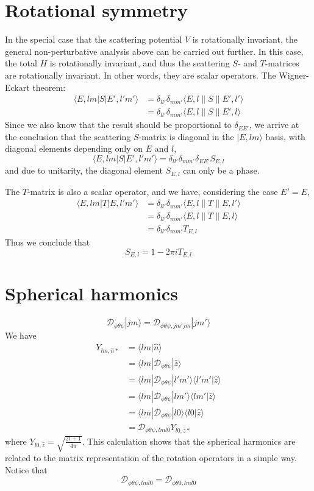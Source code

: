 \documentclass[12pt, oneside]{book}
\begin{document}
\section*{Rotational symmetry}
In the special case that the scattering potential $V$ is rotationally invariant, the general non-perturbative analysis above can be carried out further. In this case, the total $H$ is rotationally invariant, and thus the scattering $S$- and $T$-matrices are rotationally invariant. In other words, they are scalar operators. The Wigner-Eckart theorem:
\begin{align*}
\langle E,lm|S|E',l'm'\rangle
&=\delta_{ll'}\delta_{mm'}\langle E,l\|S\|E',l'\rangle\\
&=\delta_{ll'}\delta_{mm'}\langle E,l\|S\|E',l\rangle
\end{align*}
Since we also know that the result should be proportional to $\delta_{EE'}$, we arrive at the conclusion that the scattering $S$-matrix is diagonal in the $|E,lm\rangle$ basis, with diagonal elements depending only on $E$ and $l$,
\[
\langle E,lm|S|E',l'm'\rangle=\delta_{ll'}\delta_{mm'}\delta_{EE'}S_{E,l}
\]
and due to unitarity, the diagonal element $S_{E,l}$ can only be a phase.

The $T$-matrix is also a scalar operator, and we have, considering the case $E'=E$,
\begin{align*}
\langle E,lm|T|E,l'm'\rangle
&=\delta_{ll'}\delta_{mm'}\langle E,l\|T\|E,l'\rangle\\
&=\delta_{ll'}\delta_{mm'}\langle E,l\|T\|E,l\rangle\\
&=\delta_{ll'}\delta_{mm'}T_{E,l}
\end{align*}
Thus we conclude that
\[
S_{E,l}=1-2\pi iT_{E,l}
\]

\section*{Spherical harmonics}
\[
\mathcal{D}_{\phi\theta\psi}|jm\rangle=\mathcal{D}_{\phi\theta\psi,jm'jm}|jm'\rangle
\]
We have
\begin{align*}
Y_{lm,\hat{n}*}
&=\langle lm|\hat{n}\rangle\\
&=\langle lm|\mathcal{D}_{\phi\theta\psi}|\hat{z}\rangle\\
&=\langle lm|\mathcal{D}_{\phi\theta\psi}|l'm'\rangle\langle l'm'|\hat{z}\rangle\\
&=\langle lm|\mathcal{D}_{\phi\theta\psi}|lm'\rangle\langle lm'|\hat{z}\rangle\\
&=\langle lm|\mathcal{D}_{\phi\theta\psi}|l0\rangle\langle l0|\hat{z}\rangle\\
&=\mathcal{D}_{\phi\theta\psi,lml0}Y_{l0,\hat{z}*}
\end{align*}
where $Y_{l0,\hat{z}}=\sqrt{\frac{2l+1}{4\pi}}$. This calculation shows that the spherical harmonics are related to the matrix representation of the rotation operators in a simple way. Notice that
\[
\mathcal{D}_{\phi\theta\psi,lml0}=\mathcal{D}_{\phi\theta0,lml0}
\]
\end{document}
